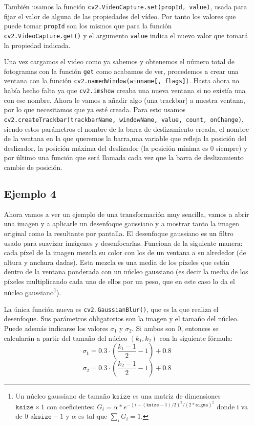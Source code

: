 \documentclass[a4paper,openright, 12pt]{book}
\begin{document}
También usamos la función \lstinline|cv2.VideoCapture.set(propId, value)|, usada para fijar el valor de alguna de las propiedades del vídeo. Por tanto los valores que puede tomar \lstinline|propId| son los mismos que para la función \lstinline|cv2.VideoCapture.get()| y el argumento \lstinline|value| indica el nuevo valor que tomará la propiedad indicada.

Una vez cargamos el video como ya sabemos y obtenemos el número total de fotogramas con la función \lstinline|get| como acabamos de ver, procedemos a crear una ventana con la función \lstinline|cv2.namedWindow(winname[, flags])|.
Hasta ahora no había hecho falta ya que \lstinline|cv2.imshow| creaba una nueva ventana si no existía una con ese nombre.
Ahora le vamos a añadir algo (una trackbar) a nuestra ventana, por lo que necesitamos que ya esté creada.
Para esto usamos \lstinline|cv2.createTrackbar(trackbarName, windowName, value, count, onChange)|, siendo estos parámetros el nombre de la barra de deslizamiento creada, el nombre de la ventana en la que queremos la barra,una variable que refleja la posición del deslizador, la posición máxima del deslizador (la posición mínima es 0 siempre) y por último una función que será llamada cada vez que la barra de deslizamiento cambie de posición.

\newpage

\subsection*{Ejemplo 4}
Ahora vamos a ver un ejemplo de una transformación muy sencilla, vamos a abrir una imagen y a aplicarle un desenfoque gaussiano y a mostrar tanto la imagen original como la resultante por pantalla. El desenfoque gaussiano es un filtro usado para suavizar imágenes y desenfocarlas. Funciona de la siguiente manera: cada píxel de la imagen mezcla su color con los de un ventana a su alrededor (de altura y anchura dadas). Esta mezcla es una media de los píxeles que están dentro de la ventana ponderada con un núcleo gaussiano (es decir la media de los píxeles multiplicando cada uno de ellos por un peso, que en este caso lo da el núcleo gaussiano\footnote{Un núcleo gaussiano de tamaño $\texttt{ksize}$ es una matriz de dimensiones $ \texttt{ksize}\times1$ con coeficientes:
$ G_i= \alpha *e^{-(i-( \texttt{ksize} -1)/2)^2/(2* \texttt{sigma} )^2}$ donde i va de $0$ a$\texttt{ksize}-1$ y $\alpha$ es tal que  $\sum_i G_i=1$. }). 

La única función nueva es 
\lstinline|cv2.GaussianBlur()|, que es la que realiza el desenfoque.
Sus parámetros obligatorios son la imagen y el tamaño del núcleo. Puede además indicarse los valores $\sigma_1$ y $\sigma_2$. Si ambos son 0, entonces se calcularán a partir del tamaño del núcleo $(k_1, k_2)$ con la siguiente fórmula:
\begin{equation*}
\sigma_1 = 0.3\cdot(\frac{k_1-1}{2} - 1) + 0.8
\end{equation*}
\begin{equation*}
\sigma_2 = 0.3\cdot(\frac{k_2-1}{2} - 1) + 0.8
\end{equation*}
\end{document}
